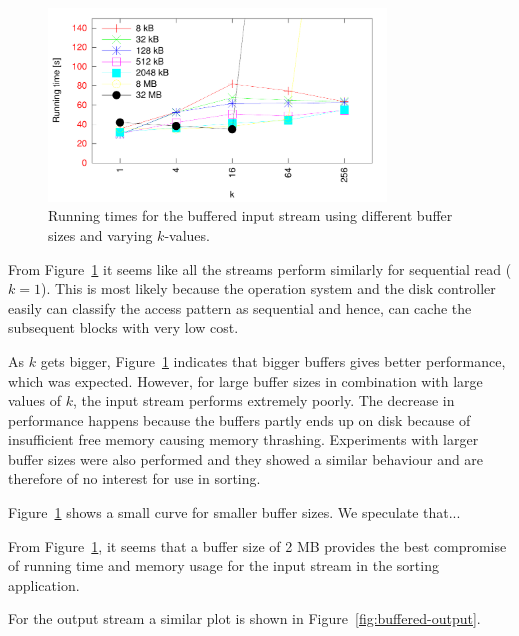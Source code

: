 \documentclass[a4paper,12pt]{article}
\begin{document}
\begin{figure}[h!]
  \centering
  \includegraphics[width=0.8\textwidth]{buffered_input}
  \caption{Running times for the buffered input stream using different
    buffer sizes and varying $k$-values.}
  \label{fig:buffered-input}
\end{figure}

From Figure~\ref{fig:buffered-input} it seems like all the streams
perform similarly for sequential read ($k = 1$). This is most likely because the operation system and the disk controller easily can classify the access pattern as sequential and hence, can cache the subsequent blocks with very low cost.

As $k$ gets bigger, Figure~\ref{fig:buffered-input} indicates that
bigger buffers gives better performance, which was expected. However,
for large buffer sizes in combination with large values of $k$, the
input stream performs extremely poorly. The decrease in performance happens because the
buffers partly ends up on disk because of insufficient free memory causing memory thrashing. Experiments with larger buffer sizes were also performed and they
showed a similar behaviour and are therefore of no
interest for use in sorting.


Figure~\ref{fig:buffered-input} shows a small curve for smaller buffer sizes. We speculate that...

From Figure~\ref{fig:buffered-input}, it seems that a buffer size of 2
MB provides the best compromise of running time and memory usage for
the input stream in the sorting application.

For the output stream a similar plot is shown in
Figure~\ref{fig:buffered-output}.
\end{document}
